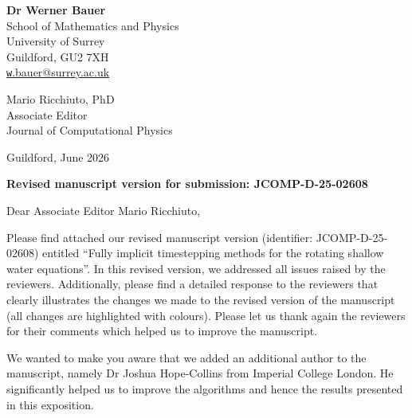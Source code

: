 \documentclass[a4paper,12pt]{article}
\begin{document}
\begin{flushright}
\textbf{Dr Werner Bauer}\\
School of Mathematics and Physics\\
University of Surrey\\
Guildford, GU2 7XH\\
\href{mailto:w.bauer@surrey.ac.uk}{\texttt w.bauer@surrey.ac.uk}\
\end{flushright}


\vspace{-0.5em}

\begin{flushleft}
Mario Ricchiuto, PhD \\
Associate Editor\\
Journal of Computational Physics
\end{flushleft}

\vspace{-0.5em}

\begin{flushright}
Guildford, June 2026
\end{flushright}

\vspace{1.5em}





{\bf Revised manuscript version for submission: JCOMP-D-25-02608}


\vspace{1.5em}
Dear Associate Editor Mario Ricchiuto,

\vspace{0.8em}


Please find attached our revised manuscript version (identifier: JCOMP-D-25-02608) entitled ``Fully implicit timestepping methods for the rotating shallow water equations''. In this revised version, we addressed all issues raised by the reviewers. Additionally, please find a detailed response to the reviewers that clearly illustrates the changes we made to the revised version of the manuscript (all changes are highlighted with colours). Please let us thank again the reviewers for their comments which helped us to improve the manuscript.

\vspace{0.8em}

We wanted to make you aware that we added an additional author to the manuscript, namely Dr Joshua Hope-Collins from Imperial College London. He significantly helped us to improve the algorithms and hence the results presented in this exposition.
\end{document}

